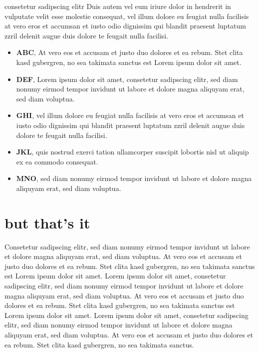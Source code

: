 \documentclass[10pt,twoside,twocolumn,openany,nodeprecatedcode]{dndbook}
\begin{document}
\begin{DndComment}{consetetur sadipscing elitr}
Duis autem vel eum iriure dolor in hendrerit in vulputate velit esse molestie consequat, vel illum dolore eu feugiat nulla facilisis at vero eros et accumsan et iusto odio dignissim qui blandit praesent luptatum zzril delenit augue duis dolore te feugait nulla facilisi.

\begin{itemize}

\item \textbf{ABC}, At vero eos et accusam et justo duo dolores et ea rebum. Stet clita kasd gubergren, no sea takimata sanctus est Lorem ipsum dolor sit amet. 
\item \textbf{DEF}, Lorem ipsum dolor sit amet, consetetur sadipscing elitr, sed diam nonumy eirmod tempor invidunt ut labore et dolore magna aliquyam erat, sed diam voluptua.
\item \textbf{GHI}, vel illum dolore eu feugiat nulla facilisis at vero eros et accumsan et iusto odio dignissim qui blandit praesent luptatum zzril delenit augue duis dolore te feugait nulla facilisi.
\item \textbf{JKL}, quis nostrud exerci tation ullamcorper suscipit lobortis nisl ut aliquip ex ea commodo consequat.
\item \textbf{MNO}, sed diam nonumy eirmod tempor invidunt ut labore et dolore magna aliquyam erat, sed diam voluptua.
\end{itemize}


\end{DndComment}

\section{but that's it}

Consetetur sadipscing elitr, sed diam nonumy eirmod tempor invidunt ut labore et dolore magna aliquyam erat, sed diam voluptua. At vero eos et accusam et justo duo dolores et ea rebum. Stet clita kasd gubergren, no sea takimata sanctus est Lorem ipsum dolor sit amet. Lorem ipsum dolor sit amet, consetetur sadipscing elitr, sed diam nonumy eirmod tempor invidunt ut labore et dolore magna aliquyam erat, sed diam voluptua. At vero eos et accusam et justo duo dolores et ea rebum. Stet clita kasd gubergren, no sea takimata sanctus est Lorem ipsum dolor sit amet. Lorem ipsum dolor sit amet, consetetur sadipscing elitr, sed diam nonumy eirmod tempor invidunt ut labore et dolore magna aliquyam erat, sed diam voluptua. At vero eos et accusam et justo duo dolores et ea rebum. Stet clita kasd gubergren, no sea takimata sanctus.
\end{document}
